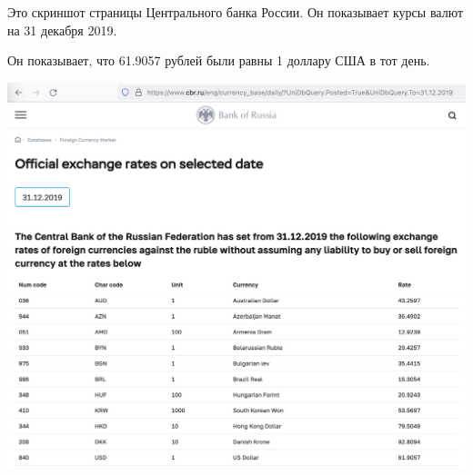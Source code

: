 
Это скриншот страницы Центрального банка России.
Он показывает курсы валют на 31 декабря 2019.

Он показывает, что 61.9057 рублей были равны 1 доллару США в тот день.

\includegraphics[width=\textwidth]{2019-12-31}

\pagebreak
